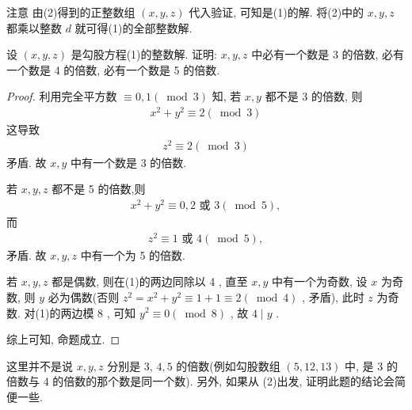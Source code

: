 注意 由(2)得到的正整数组 $(x, y, z)$ 代入验证, 可知是(1)的解. 将(2)中的 $x ,  y ,  z$ 都乘以整数 $d$ 就可得(1)的全部整数解.

\begin{example}
	设 $(x, y, z)$ 是勾股方程(1)的整数解. 证明: $x ,  y ,  z$ 中必有一个数是 3 的倍数, 必有一个数是 4 的倍数, 必有一个数是 5 的倍数.
\end{example}
\begin{proof}
	利用完全平方数 $\equiv 0,1(\bmod 3)$ 知, 若 $x ,  y$ 都不是 3 的倍数, 则
	\begin{align*}
		x^{2}+y^{2} \equiv 2(\bmod 3)
	\end{align*}
	这导致
	\begin{align*}
		z^{2} \equiv 2(\bmod 3)
	\end{align*}
	矛盾. 故 $x ,  y$ 中有一个数是 3 的倍数.

	若 $x ,  y ,  z$ 都不是 5 的倍数,则
	\begin{align*}
		x^{2}+y^{2} \equiv 0,2 \text { 或 } 3(\bmod 5),
	\end{align*}
	而
	\begin{align*}
		z^{2} \equiv 1 \text { 或 } 4(\bmod 5) ,
	\end{align*}
	矛盾. 故 $x ,  y ,  z$ 中有一个为 5 的倍数.

	若 $x ,  y ,  z$ 都是偶数, 则在(1)的两边同除以 4 , 直至 $x ,  y$ 中有一个为奇数, 设 $x$ 为奇数, 则 $y$ 必为偶数(否则 $z^{2}=x^{2}+y^{2} \equiv 1+1 \equiv 2(\bmod 4)$ , 矛盾), 此时 $z$ 为奇数. 对(1)的两边模 8 , 可知 $y^{2} \equiv 0(\bmod 8)$ , 故 $4 \mid y$ .

	综上可知, 命题成立.
\end{proof}
\begin{note}
	这里并不是说 $x ,  y ,  z$ 分别是 3,  $4 ,  5$ 的倍数(例如勾股数组 $(5,12,13)$ 中, 是 3 的倍数与 4 的倍数的那个数是同一个数). 另外, 如果从 (2)出发, 证明此题的结论会简便一些.
\end{note}

